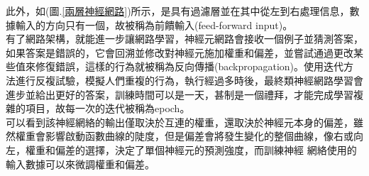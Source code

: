 \documentclass[14pt,a4paper]{report}  %
\begin{document}
 此外，如(圖.\ref{兩層神經網路})所示，是具有過濾層並在​​其中從左到右處理信息，數據輸入的方向只有一個，故被稱為前饋輸入(feed-forward input)。\\

 有了網路架構，就能進一步讓網路學習，神經元網路會接收一個例子並猜測答案，如果答案是錯誤的，它會回溯並修改對神經元施加權重和偏差，並嘗試通過更改某些值來修復錯誤，這樣的行為就被稱為反向傳播(backpropagation)。使用迭代方法進行反複試驗，模擬人們重複的行為，執行經過多時後，最終類神經網路學習會進步並給出更好的答案，訓練時間可以是一天，甚制是一個禮拜，才能完成學習複雜的項目，故每一次的迭代被稱為epoch。\\

 可以看到該神經網絡的輸出僅取決於互連的權重，還取決於神經元本身的偏差，雖然權重會影響啟動函數曲線的陡度，但是偏差會將發生變化的整個曲線，像右或向左，權重和偏差的選擇，決定了單個神經元的預測強度，而訓練神經
網絡使用的輸入數據可以來微調權重和偏差。\\
\end{document}
